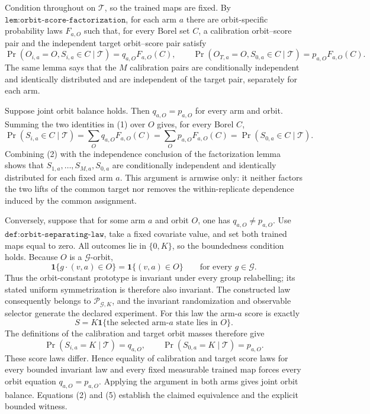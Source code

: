 Condition throughout on \(\mathcal T\), so the trained maps are fixed. By \(\texttt{lem:orbit-score-factorization}\), for each arm \(a\) there are orbit-specific probability laws \(F_{a,O}\) such that, for every Borel set \(C\), a calibration orbit--score pair and the independent target orbit--score pair satisfy
\[
\Pr(O_{i,a}=O,S_{i,a}\in C\mid\mathcal T)=q_{a,O}F_{a,O}(C),
\qquad
\Pr(O_{T,a}=O,S_{0,a}\in C\mid\mathcal T)=p_{a,O}F_{a,O}(C).
\tag{1}
\]
The same lemma says that the \(M\) calibration pairs are conditionally independent and identically distributed and are independent of the target pair, separately for each arm.

Suppose joint orbit balance holds. Then \(q_{a,O}=p_{a,O}\) for every arm and orbit. Summing the two identities in (1) over \(O\) gives, for every Borel \(C\),
\[
\Pr(S_{i,a}\in C\mid\mathcal T)=\sum_Oq_{a,O}F_{a,O}(C)=\sum_Op_{a,O}F_{a,O}(C)=\Pr(S_{0,a}\in C\mid\mathcal T).
\tag{2}
\]
Combining (2) with the independence conclusion of the factorization lemma shows that \(S_{1,a},\ldots,S_{M,a},S_{0,a}\) are conditionally independent and identically distributed for each fixed arm \(a\). This argument is armwise only: it neither factors the two lifts of the common target nor removes the within-replicate dependence induced by the common assignment.

Conversely, suppose that for some arm \(a\) and orbit \(O\), one has \(q_{a,O}\ne p_{a,O}\). Use \(\texttt{def:orbit-separating-law}\), take a fixed covariate value, and set both trained maps equal to zero. All outcomes lie in \(\{0,K\}\), so the boundedness condition holds. Because \(O\) is a \(\mathcal G\)-orbit,
\[
\mathbf 1\{g\cdot(v,a)\in O\}=\mathbf 1\{(v,a)\in O\}
\qquad\text{for every }g\in\mathcal G.
\tag{3}
\]
Thus the orbit-constant prototype is invariant under every group relabelling; its stated uniform symmetrization is therefore also invariant. The constructed law consequently belongs to \(\mathcal P_{\mathcal G,K}\), and the invariant randomization and observable selector generate the declared experiment. For this law the arm-\(a\) score is exactly
\[
S=K\mathbf 1\{\text{the selected arm-}a\text{ state lies in }O\}.
\tag{4}
\]
The definitions of the calibration and target orbit masses therefore give
\[
\Pr(S_{i,a}=K\mid\mathcal T)=q_{a,O},
\qquad
\Pr(S_{0,a}=K\mid\mathcal T)=p_{a,O}.
\tag{5}
\]
These score laws differ. Hence equality of calibration and target score laws for every bounded invariant law and every fixed measurable trained map forces every orbit equation \(q_{a,O}=p_{a,O}\). Applying the argument in both arms gives joint orbit balance. Equations (2) and (5) establish the claimed equivalence and the explicit bounded witness.